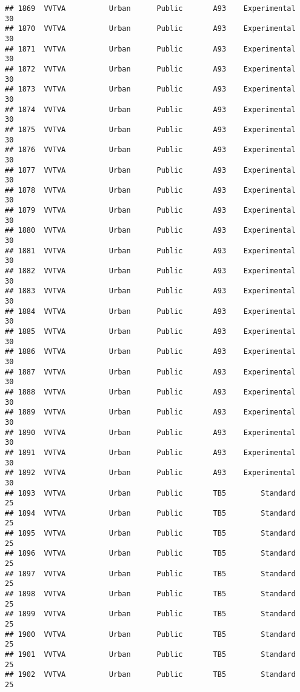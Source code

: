 \documentclass[
]{article}
\begin{document}
\begin{verbatim}
## 1869  VVTVA          Urban      Public       A93    Experimental        30
## 1870  VVTVA          Urban      Public       A93    Experimental        30
## 1871  VVTVA          Urban      Public       A93    Experimental        30
## 1872  VVTVA          Urban      Public       A93    Experimental        30
## 1873  VVTVA          Urban      Public       A93    Experimental        30
## 1874  VVTVA          Urban      Public       A93    Experimental        30
## 1875  VVTVA          Urban      Public       A93    Experimental        30
## 1876  VVTVA          Urban      Public       A93    Experimental        30
## 1877  VVTVA          Urban      Public       A93    Experimental        30
## 1878  VVTVA          Urban      Public       A93    Experimental        30
## 1879  VVTVA          Urban      Public       A93    Experimental        30
## 1880  VVTVA          Urban      Public       A93    Experimental        30
## 1881  VVTVA          Urban      Public       A93    Experimental        30
## 1882  VVTVA          Urban      Public       A93    Experimental        30
## 1883  VVTVA          Urban      Public       A93    Experimental        30
## 1884  VVTVA          Urban      Public       A93    Experimental        30
## 1885  VVTVA          Urban      Public       A93    Experimental        30
## 1886  VVTVA          Urban      Public       A93    Experimental        30
## 1887  VVTVA          Urban      Public       A93    Experimental        30
## 1888  VVTVA          Urban      Public       A93    Experimental        30
## 1889  VVTVA          Urban      Public       A93    Experimental        30
## 1890  VVTVA          Urban      Public       A93    Experimental        30
## 1891  VVTVA          Urban      Public       A93    Experimental        30
## 1892  VVTVA          Urban      Public       A93    Experimental        30
## 1893  VVTVA          Urban      Public       TB5        Standard        25
## 1894  VVTVA          Urban      Public       TB5        Standard        25
## 1895  VVTVA          Urban      Public       TB5        Standard        25
## 1896  VVTVA          Urban      Public       TB5        Standard        25
## 1897  VVTVA          Urban      Public       TB5        Standard        25
## 1898  VVTVA          Urban      Public       TB5        Standard        25
## 1899  VVTVA          Urban      Public       TB5        Standard        25
## 1900  VVTVA          Urban      Public       TB5        Standard        25
## 1901  VVTVA          Urban      Public       TB5        Standard        25
## 1902  VVTVA          Urban      Public       TB5        Standard        25

\end{verbatim}
\end{document}
